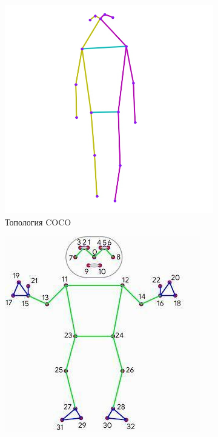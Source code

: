 \begin{figure}[h]
\begin{subfigure}[b]{.3\textwidth}
	\centering
	\includegraphics[width=\textwidth]{./images/COCO_topology.jpg}
	\caption{Топология COCO}
	\label{fig:COCO_topology}
\end{subfigure}
\begin{subfigure}[b]{.3\textwidth}
	\centering
   \includegraphics[width=\textwidth]{./images/BlazePose_topology.jpg}

\end{subfigure}
\end{figure}
